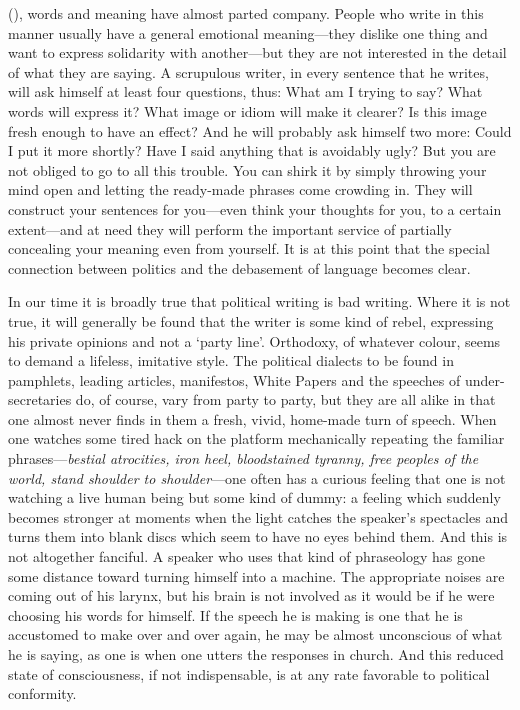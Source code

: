 (), words and meaning have almost parted company. People who
write in this manner usually have a general emotional meaning---they
dislike one thing and want to express solidarity with another---but
they are not interested in the detail of what they are saying. A
scrupulous writer, in every sentence that he writes, will ask himself
at least four questions, thus: What am I trying to say? What words
will express it? What image or idiom will make it clearer? Is this
image fresh enough to have an effect? And he will probably ask himself
two more: Could I put it more shortly? Have I said anything that is
avoidably ugly? But you are not obliged to go to all this trouble. You
can shirk it by simply throwing your mind open and letting the
ready-made phrases come crowding in. They will construct your
sentences for you---even think your thoughts for you, to a certain
extent---and at need they will perform the important service of
partially concealing your meaning even from yourself. It is at this
point that the special connection between politics and the debasement
of language becomes clear.

In our time it is broadly true that political writing is bad writing.
Where it is not true, it will generally be found that the 
writer is some kind of rebel, expressing his private opinions and not
a `party line'. Orthodoxy, of whatever colour, seems to demand a
lifeless, imitative style. The political dialects to be found in
pamphlets, leading articles, manifestos, White Papers and the speeches
of under-secretaries do, of course, vary from party to party, but they
are all alike in that one almost never finds in them a fresh, vivid,
home-made turn of speech. When one watches some tired hack on the
platform mechanically repeating the familiar phrases---\textit{bestial
atrocities, iron heel, bloodstained tyranny, free peoples of the
world, stand shoulder to shoulder}---one often has a curious feeling
that one is not watching a live human being but some kind of dummy: a
feeling which suddenly becomes stronger at moments when the light
catches the speaker's spectacles and turns them into blank discs which
seem to have no eyes behind them. And this is not altogether fanciful.
A speaker who uses that kind of phraseology has gone some distance
toward turning himself into a machine. The appropriate noises are
coming out of his larynx, but his brain is not involved as it would be
if he were choosing his words for himself. If the speech he is making
is one that he is accustomed to make over and over again, he may be
almost unconscious of what he is saying, as one is when one utters the
responses in church. And this reduced state of consciousness, if not
indispensable, is at any rate favorable to political conformity.

